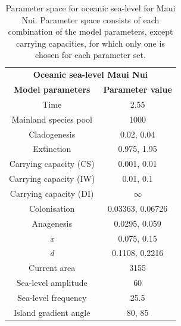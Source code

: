 \begin{table}[ht]
    \centering
    \caption{Parameter space for oceanic sea-level for Maui Nui. Parameter space consists of each combination of the model parameters, except carrying capacities, for which only one is chosen for each parameter set.}
    \begin{tabular}{ c | c }
        \multicolumn{2}{c}{\textbf{Oceanic sea-level Maui Nui}} \\
        \textbf{Model parameters} & \textbf{Parameter value} \\ 
        \hline
        \hline
        Time & 2.55 \\
        \hline
        Mainland species pool & 1000 \\
        \hline
        Cladogenesis & 0.02, 0.04 \\
        \hline
        Extinction & 0.975, 1.95 \\
        \hline
        Carrying capacity (CS) & 0.001, 0.01 \\
        \hline
        Carrying capacity (IW) & 0.01, 0.1 \\
        \hline
        Carrying capacity (DI) & $\infty$ \\
        \hline
        Colonisation & 0.03363, 0.06726 \\
        \hline
        Anagenesis & 0.0295, 0.059 \\
        \hline
        \textit{x} & 0.075, 0.15 \\
        \hline
        \textit{d} & 0.1108, 0.2216 \\
        \hline
        Current area & 3155 \\
        \hline
        Sea-level amplitude & 60 \\
        \hline
        Sea-level frequency & 25.5 \\
        \hline
        Island gradient angle & 80, 85 \\
    \end{tabular}
    \label{tab:oceanic_sea_level_young}
\end{table}

